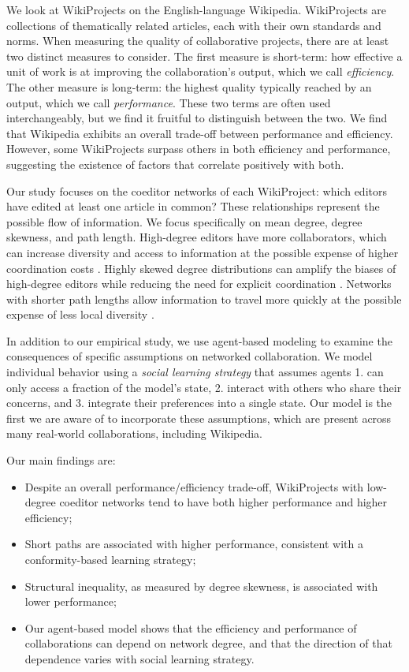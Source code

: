 We look at WikiProjects on the English-language Wikipedia.
WikiProjects are collections of thematically related articles,
each with their own standards and norms.
When measuring the quality of collaborative projects,
there are at least two distinct measures to consider.
The first measure is short-term:
how effective a unit of work is at improving
the collaboration's output,
which we call {\em efficiency}.
The other measure is long-term:
the highest quality typically reached by an output,
which we call {\em performance}.
These two terms are often used interchangeably,
but we find it fruitful to distinguish between the two.
We find that Wikipedia exhibits an overall trade-off between performance and efficiency.
However, some WikiProjects surpass others in both efficiency and performance,
suggesting the existence of factors that correlate positively with both.

Our study focuses on the coeditor networks of each WikiProject:
which editors have edited at least one article in common?
These relationships represent the possible flow of information.
We focus specifically on mean degree, degree skewness, and path length.
High-degree editors have more collaborators,
which can increase diversity and access to information at the possible
expense of higher coordination costs
\cite{hong_groups_2004,golub_naive_2010}.
Highly skewed degree distributions can amplify the biases of high-degree
editors while reducing the need for explicit coordination
\cite{kearns_experiments_2012}.
Networks with shorter path lengths allow information to travel more quickly
at the possible expense of less local diversity
\cite{mason_propagation_2008,barkoczi_social_2016}.

In addition to our empirical study,
we use agent-based modeling to examine the consequences of specific
assumptions on networked collaboration.
We model individual behavior using a {\em social learning strategy} that
assumes agents 1. can only access a fraction of the model's state,
2. interact with others who share their concerns,
and 3. integrate their preferences into a single state.
Our model is the first we are aware of to incorporate these assumptions,
which are present across many real-world collaborations,
including Wikipedia.

Our main findings are:
\begin{itemize}
\item Despite an overall performance/efficiency trade-off,
WikiProjects with low-degree coeditor networks tend to have both higher performance and higher efficiency;
\item Short paths are associated with higher performance, consistent with a conformity-based learning strategy;
\item Structural inequality, as measured by degree skewness, is associated with lower performance;
\item Our agent-based model
shows that the efficiency and performance of collaborations can
depend on network degree,
and that the direction of that dependence varies with social learning strategy.
\end{itemize}

